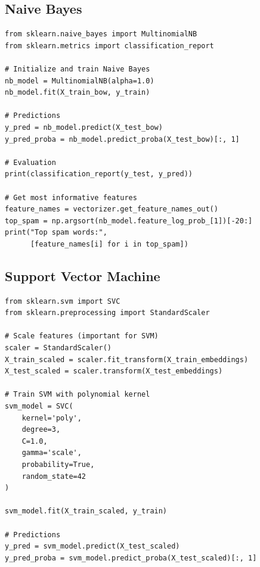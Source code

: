\documentclass[12pt,a4paper,twoside]{book}
\begin{document}
\subsection{Naive Bayes}

\begin{tcolorbox}[myCustomStyle={Naive Bayes Training}]
    \begin{lstlisting}[style=myPythonStyle]
from sklearn.naive_bayes import MultinomialNB
from sklearn.metrics import classification_report

# Initialize and train Naive Bayes
nb_model = MultinomialNB(alpha=1.0)
nb_model.fit(X_train_bow, y_train)

# Predictions
y_pred = nb_model.predict(X_test_bow)
y_pred_proba = nb_model.predict_proba(X_test_bow)[:, 1]

# Evaluation
print(classification_report(y_test, y_pred))

# Get most informative features
feature_names = vectorizer.get_feature_names_out()
top_spam = np.argsort(nb_model.feature_log_prob_[1])[-20:]
print("Top spam words:", 
      [feature_names[i] for i in top_spam])
\end{lstlisting}
\end{tcolorbox}

\subsection{Support Vector Machine}

\begin{tcolorbox}[myCustomStyle={SVM with Polynomial Kernel}]
    \begin{lstlisting}[style=myPythonStyle]
from sklearn.svm import SVC
from sklearn.preprocessing import StandardScaler

# Scale features (important for SVM)
scaler = StandardScaler()
X_train_scaled = scaler.fit_transform(X_train_embeddings)
X_test_scaled = scaler.transform(X_test_embeddings)

# Train SVM with polynomial kernel
svm_model = SVC(
    kernel='poly',
    degree=3,
    C=1.0,
    gamma='scale',
    probability=True,
    random_state=42
)

svm_model.fit(X_train_scaled, y_train)

# Predictions
y_pred = svm_model.predict(X_test_scaled)
y_pred_proba = svm_model.predict_proba(X_test_scaled)[:, 1]
\end{lstlisting}
\end{tcolorbox}
\end{document}
